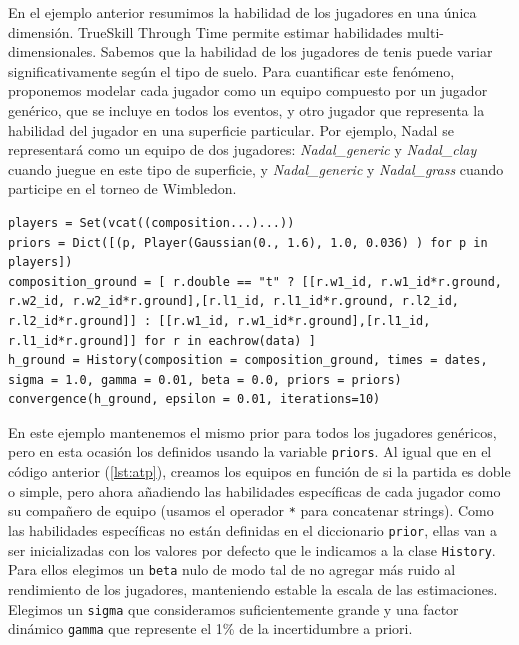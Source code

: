 \documentclass[a4paper,11pt]{book}
\theoremstyle{definition}
\newif\ifen
\newcommand{\en}[1]{\ifen#1\fi}
\begin{document}
En el ejemplo anterior resumimos la habilidad de los jugadores en una \'unica dimensi\'on.
%
TrueSkill Through Time permite estimar habilidades multi-dimensionales.
%
Sabemos que la habilidad de los jugadores de tenis puede variar significativamente seg\'un el tipo de suelo.
%
\en{To quantify this phenomenon, we propose modeling each player as a team composed of a generic player, who is included in all the games, and another player representing the ability of the player on a particular surface. } %
Para cuantificar este fen\'omeno, proponemos modelar cada jugador como un equipo compuesto por un jugador genérico, que se incluye en todos los eventos, y otro jugador que representa la habilidad del jugador en una superficie particular.
%
Por ejemplo, Nadal se representará como un equipo de dos jugadores: \emph{Nadal\_generic} y \emph{Nadal\_clay} cuando juegue en este tipo de superficie, y \emph{Nadal\_generic} y \emph{Nadal\_grass} cuando participe en el torneo de Wimbledon.
\begin{lstlisting}[captionpos=b,backgroundcolor=\color{julia!60},label=lst:atp_ground, caption={Modelando habilidades multi-dimensionales en la historia de la ATP}, belowskip=0cm]
players = Set(vcat((composition...)...))
priors = Dict([(p, Player(Gaussian(0., 1.6), 1.0, 0.036) ) for p in players])
composition_ground = [ r.double == "t" ? [[r.w1_id, r.w1_id*r.ground, r.w2_id, r.w2_id*r.ground],[r.l1_id, r.l1_id*r.ground, r.l2_id, r.l2_id*r.ground]] : [[r.w1_id, r.w1_id*r.ground],[r.l1_id, r.l1_id*r.ground]] for r in eachrow(data) ]
h_ground = History(composition = composition_ground, times = dates, sigma = 1.0, gamma = 0.01, beta = 0.0, priors = priors)
convergence(h_ground, epsilon = 0.01, iterations=10)
\end{lstlisting}
%
En este ejemplo mantenemos el mismo prior para todos los jugadores genéricos, pero en esta ocasi\'on los definidos usando la variable \texttt{priors}.
%
Al igual que en el c\'odigo anterior (\ref{lst:atp}), creamos los equipos en funci\'on de si la partida es doble o simple, pero ahora añadiendo las habilidades específicas de cada jugador como su compañero de equipo (usamos el operador \texttt{*} para concatenar strings).
%
Como las habilidades específicas no están definidas en el diccionario \texttt{prior}, ellas van a ser inicializadas con los valores por defecto que le indicamos a la clase \texttt{History}.
%
Para ellos elegimos un \texttt{beta} nulo de modo tal de no agregar más ruido al rendimiento de los jugadores, manteniendo estable la escala de las estimaciones.
%
Elegimos un \texttt{sigma} que consideramos suficientemente grande y una factor dinámico \texttt{gamma} que represente el 1\% de la incertidumbre a priori.
\end{document}
